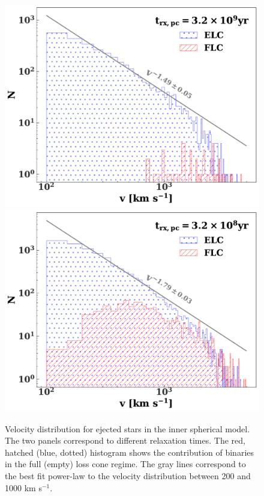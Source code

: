 \documentclass[fleqn,usenatbib]{mnras}
\begin{document}
\begin{figure}
    \includegraphics[width=\columnwidth]{figures/pdf_fit.pdf}
    \includegraphics[width=\columnwidth]{figures/pdf_fit_b.pdf}
    \caption{Velocity distribution for ejected stars in the inner spherical model. The two panels correspond to different relaxation times. The red, hatched (blue, dotted) histogram shows the contribution of binaries in the full (empty) loss cone regime. The gray lines correspond to the best fit power-law to the velocity distribution between 200 and 1000 km s$^{-1}$.
    \label{fig:pdf}}
\end{figure}
\end{document}
